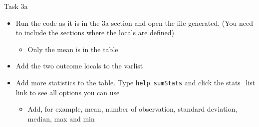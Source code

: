 \documentclass[aspectratio=169]{beamer}
\begin{document}
\begin{frame}{Task 3a}
	\begin{itemize}
		\item Run the code as it is in the 3a section and open the file generated. (You need to include the sections where the locals are defined)
		\begin{itemize}
			\item Only the mean is in the table
		\end{itemize}
		\item Add the two outcome locals to the varlist
		\item Add more statistics to the table. Type \texttt{help sumStats} and click the stats\_list link to see all options you can use
		\begin{itemize}
			\item Add, for example, mean, number of observation, standard deviation, median, max and min
		\end{itemize}
	\end{itemize}
\end{frame}
\end{document}
